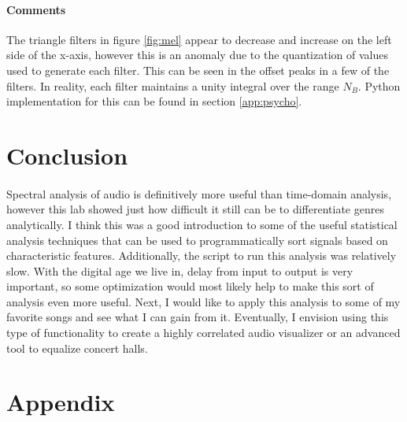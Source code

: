 \documentclass[11pt,a4paper]{article}
\begin{document}
\paragraph{Comments} The triangle filters in figure \ref{fig:mel} appear to decrease and increase on the left side of the x-axis, however this is an anomaly due to the quantization of values used to generate each filter. This can be seen in the offset peaks in a few of the filters. In reality, each filter maintains a unity integral over the range $N_B$. Python implementation for this can be found in section \ref{app:psycho}.

\pagebreak

\section{Conclusion} 
\paragraph*{} Spectral analysis of audio is definitively more useful than time-domain analysis, however this lab showed just how difficult it still can be to differentiate genres analytically. I think this was a good introduction to some of the useful statistical analysis techniques that can be used to programmatically sort signals based on characteristic features. Additionally, the script to run this analysis was relatively slow. With the digital age we live in, delay from input to output is very important, so some optimization would most likely help to make this sort of analysis even more useful. Next, I would like to apply this analysis to some of my favorite songs and see what I can gain from it. Eventually, I envision using this type of functionality to create a highly correlated audio visualizer or an advanced tool to equalize concert halls.

\pagebreak

\section{Appendix}
\end{document}
